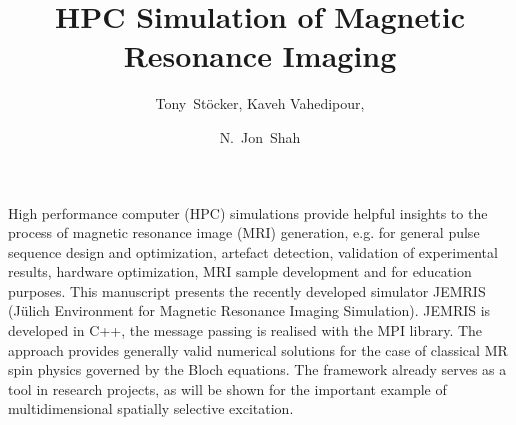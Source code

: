 \documentclass{nic-series}
\begin{document}
 

\title{HPC Simulation of Magnetic Resonance Imaging}

\author{Tony~St\"ocker, Kaveh Vahedipour, \and N.~Jon~Shah }


\maketitle

\begin{abstracts}
High performance computer (HPC) simulations provide helpful insights to the process of magnetic resonance
image (MRI) generation, e.g. for general pulse sequence design and optimization, artefact detection, validation of
experimental results, hardware optimization, MRI sample development and for education purposes. This manuscript presents
the recently developed simulator JEMRIS (Jülich Environment for Magnetic Resonance Imaging Simulation). JEMRIS is
developed in C++, the message passing is realised with the MPI library. The approach provides generally valid numerical
solutions for the case of classical MR spin physics governed by the Bloch equations. The framework already serves as a tool
in research projects, as will be shown for the important example of multidimensional spatially selective excitation.
\end{abstracts}

\end{document}
